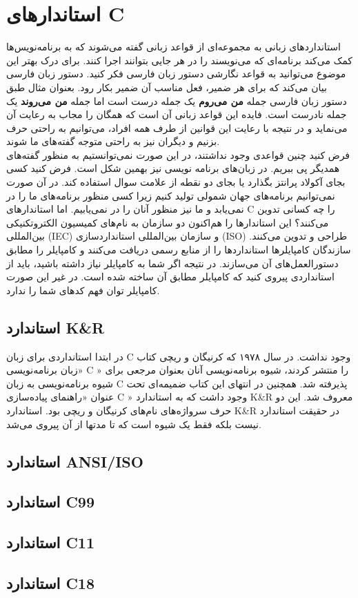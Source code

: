 \chapter{استاندارهای C}
استانداردهای زبانی به مجموعه‌ای از قواعد زبانی گفته می‌شوند که به برنامه‌نویس‌ها کمک می‌کند برنامه‌ای که می‌نویسند را در هر جایی بتوانند اجرا کنند. برای درک بهتر این موضوع می‌توانید به قواعد نگارشی دستور زبان فارسی فکر کنید. دستور زبان فارسی بیان می‌کند که برای هر ضمیر، فعل مناسب آن ضمیر بکار رود. بعنوان مثال طبق دستور زبان فارسی جمله \textbf{من می‌روم} یک جمله درست است اما جمله \textbf{من می‌روند} یک جمله نادرست است. فایده این قواعد زبانی آن است که همگان را مجاب به رعایت آن می‌نماید و در نتیجه با رعایت این قوانین از طرف همه افراد، می‌توانیم به راحتی حرف بزنیم و دیگران نیز به راحتی متوجه گفته‌های ما شوند.\\
فرض کنید چنین قواعدی وجود نداشتند، در این صورت نمی‌توانستیم به منظور گفته‌های همدیگر پی ببریم. در زبان‌های برنامه نویسی نیز بهمین شکل است. فرض کنید کسی بجای آکولاد پرانتز بگذارد یا بجای دو نقطه از علامت سوال استفاده کند. در آن صورت نمی‌توانیم برنامه‌های جهان شمولی تولید کنیم زیرا کسی منظور برنامه‌های ما را در نمی‌یابد و ما نیز منظور آنان را در نمی‌یابیم. اما استاندارهای C را چه کسانی تدوین می‌کنند؟ این استاندارها را هم‌اکنون دو سازمان به نام‌های کمیسیون الکتروتکنیکی بین‌المللی (IEC) و سازمان بین‌المللی استانداردسازی (ISO) طراحی و تدوین می‌کنند. سازندگان کامپایلرها استانداردها را از منابع رسمی دریافت می‌کنند و کامپایلر را مطابق دستورالعمل‌های آن می‌سازند. در نتیجه اگر شما به کامپایلر نیاز داشته باشید، باید از استانداردی پیروی کنید که کامپایلر مطابق آن ساخته شده است. در غیر این صورت کامپایلر توان فهم کدهای شما را ندارد.
\section{استاندارد K\&R}
در ابتدا استانداردی برای زبان C وجود نداشت. در سال ۱۹۷۸ که کرنیگان و ریچی کتاب «زبان برنامه‌نویسی C » را منتشر کردند، شیوه برنامه‌نویسی آنان بعنوان مرجعی برای شیوه برنامه‌نویسی به زبان C پذیرفته شد. همچنین در انتهای این کتاب ضمیمه‌ای تحت عنوان «راهنمای پیاده‌سازی C » وجود داشت که به استاندارد K\&R معروف شد. این دو حرف سرواژه‌های نام‌های کرنیگان و ریچی بود. استاندارد K\&R در حقیقت استاندارد نیست بلکه فقط یک شیوه است که تا مدتها از آن پیروی می‌شد.
\section{استاندارد ANSI/ISO}
\section{استاندارد C99}
\section{استاندارد C11}
\section{استاندارد C18}
